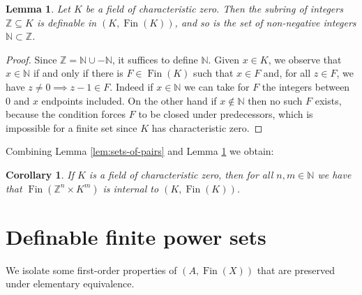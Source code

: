 \documentclass{amsart}
\newcommand{\Z}{\mathbb Z}
\newcommand{\N}{\mathbb N}
\newcommand{\Fin}{\operatorname{Fin}}
\newcommand{\nin}{\not \in}
\theoremstyle{plain}
\newtheorem{cor}[thm]{Corollary}
\newtheorem{lem}[thm]{Lemma}
\theoremstyle{definition}
\begin{document}
\begin{lem}\label{lem:Z}
Let $K$ be a field of characteristic zero. Then the subring of integers $\Z \subseteq K$ is definable in $(K, \Fin(K))$, and so is the set of non-negative integers $\N \subset \Z$. 
\end{lem}
\begin{proof} Since $\Z = \N\cup -\N$, it suffices to define $\N$. 
Given $x\in K$, we observe that $x\in \N$ if and only if there is $F\in \Fin(K)$ such that $x \in F$ and, for all $z\in F$, we have $z\neq 0 \implies z-1 \in F$.
Indeed if $x \in \N$ we can take for $F$ the integers between $0$ and $x$ endpoints included. On the other hand if $x\nin \N$ then no such $F$ exists, because the condition forces $F$ to be closed under predecessors, which is impossible for a finite set since $K$ has characteristic zero.   
\end{proof}

Combining Lemma \ref{lem:sets-of-pairs} and Lemma \ref{lem:Z} we obtain: 

\begin{cor}
If $K$ is a field of characteristic zero, then for all $n,m \in \N$ we have that $\Fin(\Z^n \times K^m)$ is internal to $(K,\Fin(K))$.
\end{cor} 

\section{Definable finite power sets}\label{sec:deffps}
We isolate some first-order properties of $(A, \Fin(X))$ that are preserved under elementary equivalence.
\end{document}
